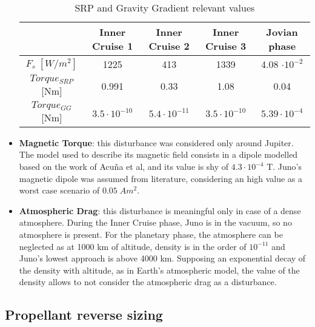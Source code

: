 \begin{itemize}
    \begin{table}[H]
        \renewcommand{\arraystretch}{1.3}
        \centering
        \begin{tabular}{|c|c|c|c|c|}
            \hline
            &\textbf{Inner Cruise 1} & \textbf{Inner Cruise 2} & \textbf{Inner Cruise 3} & \textbf{Jovian phase} \\
            \hline
            \hline
            $F_{s} \; [W/m^2]$ & 1225 & 413 & 1339 & 4.08 $\cdot 10^{-2}$ \\
            \hline
            $Torque_{SRP}$ [Nm] & 0.991 & 0.33 & 1.08 & 0.04 \\
            \hline
             $Torque_{GG}$ [Nm] & $3.5 \cdot 10^{-10}$ & $5.4 \cdot 10^{-11}$ & $3.5 \cdot 10^{-10}$ & $5.39 \cdot 10^{-4}$ \\
            \hline
        \end{tabular}
        \caption{SRP and Gravity Gradient relevant values}
        \label{table:SRP_GGG}
    \end{table}
    
    \item \textbf{Magnetic Torque}: this disturbance was considered only around Jupiter. The model used to describe its magnetic field consists in a dipole modelled based on the work of Acuña et al\cite{jupiter_mag_field}, and its value is shy of $4.3\cdot 10^{-4}$ T. Juno's magnetic dipole was assumed from literature, considering an high value as a worst case scenario of $0.05 \; Am^2$.
    
    \item \textbf{Atmospheric Drag}: this disturbance is meaningful only in case of a dense atmosphere. During the Inner Cruise phase, Juno is in the vacuum, so no atmosphere is present. For the planetary phase, the atmosphere can be neglected as at 1000 km of altitude, density is in the order of $10^{-11}$ and Juno's lowest approach is above 4000 km. Supposing an exponential decay of the density with altitude, as in Earth's atmospheric model, the value of the density allows to not consider the atmospheric drag as a disturbance\cite{jupiter_density}.
    
        
\end{itemize}

\subsection{Propellant reverse sizing}
\label{subsec:prop_rev_sizing}

